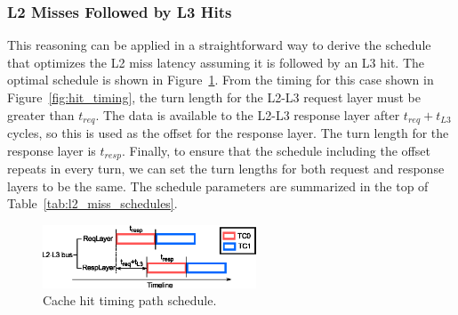 \subsubsection{L2 Misses Followed by L3 Hits}
This reasoning can be applied in a straightforward way to derive the schedule 
that optimizes the L2 miss latency assuming it is followed by an L3 hit.
The optimal schedule is shown in Figure~\ref{fig:hit_schedule}.
From the timing for this case shown in Figure~\ref{fig:hit_timing}, the turn
length for the L2-L3 request layer must be greater than $t_{req}$. The 
data is available to the L2-L3 response layer after $t_{req}+t_{L3}$ cycles, so 
this is used as the offset for the response layer. The turn length for the 
response layer is $t_{resp}$. 
Finally, to ensure that the schedule including the offset repeats in every 
turn, we can set the turn lengths for both request and response layers to be
the same.
The schedule parameters are summarized 
in the top of Table~\ref{tab:l2_miss_schedules}.

\begin{figure}
    \begin{center}
        \includegraphics[width=2.5in]{figs/hit_schedule.eps}
        \caption{Cache hit timing path schedule.}
        \label{fig:hit_schedule}
		\vspace{-0.2in}
    \end{center}
\end{figure}

